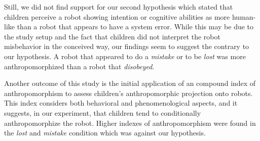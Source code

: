 \documentclass[letterpaper, 10pt, conference]{ieeeconf}
\begin{document}
%
%
%


Still, we did not find support for our second hypothesis which stated that
children perceive a robot showing intention or cognitive abilities as more
human-like than a robot that appears to have a system error. While this may be
due to the study setup and the fact that children did not interpret the robot
misbehavior in the conceived way, our findings seem to suggest the contrary to
our hypothesis. A robot that appeared to do a \textit{mistake} or to be
\textit{lost} was more anthropomorphized than a robot that \textit{disobeyed}.


Another outcome of this study is the initial application of an compound index of
anthropomorphism to assess children's anthropomorphic projection onto robots.
This index considers both behavioral and phenomenological aspects, and it
suggests, in our experiment, that children tend to conditionally
anthropomorphize the robot. Higher indexes of anthropomorphism were found in the
\textit{lost} and \textit{mistake} condition which was against our hypothesis.
\end{document}
